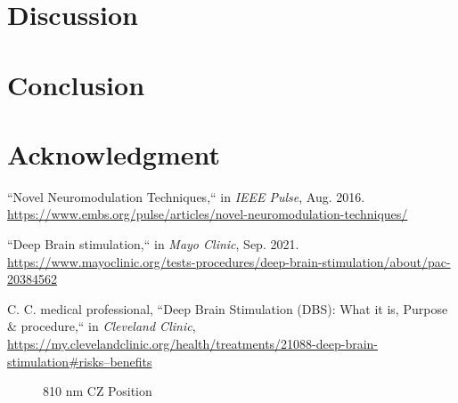 \documentclass[journal,twoside,web]{ieeecolor}
\begin{document}
\section{Discussion}
\label{sec:next steps}

\section{Conclusion}
\label{sec:conclusion}

\section*{Acknowledgment}

\begin{thebibliography}{00}

 ``Novel Neuromodulation Techniques,`` in \emph{IEEE Pulse}, Aug. 2016. 
\underline{https://www.embs.org/pulse/articles/novel-neuromodulation-techniques/} 

 ``Deep Brain stimulation,`` in \emph{Mayo Clinic}, Sep. 2021. 
\underline{https://www.mayoclinic.org/tests-procedures/deep-brain-stimulation/about/pac-20384562}

 C. C. medical professional, ``Deep Brain Stimulation (DBS): What it is, Purpose \& procedure,`` in \emph{Cleveland Clinic}, 
\underline{https://my.clevelandclinic.org/health/treatments/21088-deep-brain-stimulation\#risks--benefits}

\end{thebibliography}

\begin{figure}[!htb]
    \caption{\label{fig:810-CZ} 810 nm CZ Position}
\end{figure}
\end{document}
